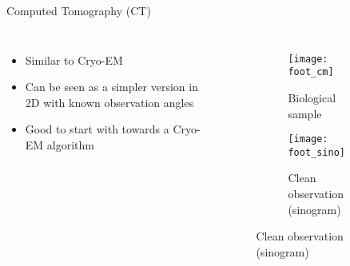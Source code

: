 

\begin{frame}[c]{Computed Tomography (CT)}
    \pause
    \begin{columns}[c]
            \begin{itemize}
                \item<2-> Similar to Cryo-EM
                \item<2-> Can be seen as a simpler version in 2D with known observation angles
                \item<2-> Good to start with towards a Cryo-EM algorithm
            \end{itemize}
        
        \pause
        \begin{figure}
            \centering
            \begin{subfigure}[t]{0.45\textwidth}
                \texttt{[image: foot\_cm]}
                \caption{Biological sample}
            \end{subfigure}\hfill                
            \begin{subfigure}[t]{0.45\textwidth}
                \texttt{[image: foot\_sino]}
                \caption{Clean observation (sinogram)}
            \end{subfigure}\hfill          
        \end{figure}

        
    \end{columns}
\end{frame}


